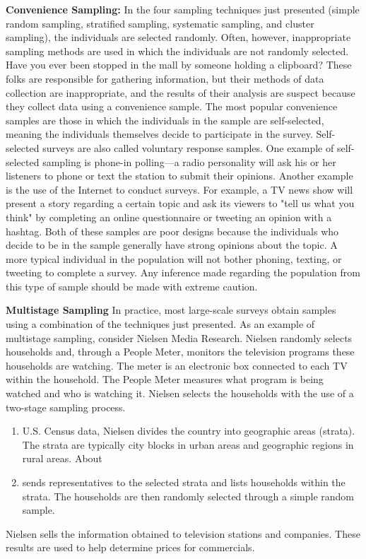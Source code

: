 \documentclass{report}
\begin{document}
        \bigbreak \noindent 
        \textbf{Convenience Sampling:}
        \bigbreak \noindent 
        In the four sampling techniques just presented (simple random sampling, stratified sampling, systematic sampling, and cluster sampling), the individuals are selected randomly. Often, however, inappropriate sampling methods are used in which the individuals are not randomly selected.
        \bigbreak \noindent 
        Have you ever been stopped in the mall by someone holding a clipboard? These folks are responsible for gathering information, but their methods of data collection are inappropriate, and the results of their analysis are suspect because they collect data using a convenience sample.
        \bigbreak \noindent 
        The most popular convenience samples are those in which the individuals in the sample are self-selected, meaning the individuals themselves decide to participate in the survey. Self-selected surveys are also called voluntary response samples. One example of self-selected sampling is phone-in polling—a radio personality will ask his or her listeners to phone or text the station to submit their opinions. Another example is the use of the Internet to conduct surveys. For example, a TV news show will present a story regarding a certain topic and ask its viewers to "tell us what you think" by completing an online questionnaire or tweeting an opinion with a hashtag.
        \bigbreak \noindent 
        Both of these samples are poor designs because the individuals who decide to be in the sample generally have strong opinions about the topic. A more typical individual in the population will not bother phoning, texting, or tweeting to complete a survey. Any inference made regarding the population from this type of sample should be made with extreme caution.

        \pagebreak \bigbreak \noindent
        \textbf{Multistage Sampling}
        \bigbreak \noindent 
        In practice, most large-scale surveys obtain samples using a combination of the techniques just presented.
        \bigbreak \noindent 
        As an example of multistage sampling, consider Nielsen Media Research. Nielsen randomly selects households and, through a People Meter, monitors the television programs these households are watching. The meter is an electronic box connected to each TV within the household. The People Meter measures what program is being watched and who is watching it. Nielsen selects the households with the use of a two-stage sampling process.
        \begin{enumerate}
            \item U.S. Census data, Nielsen divides the country into geographic areas (strata). The strata are typically city blocks in urban areas and geographic regions in rural areas. About 
            \item sends representatives to the selected strata and lists households within the strata. The households are then randomly selected through a simple random sample.
        \end{enumerate}
        Nielsen sells the information obtained to television stations and companies. These results are used to help determine prices for commercials.
\end{document}
